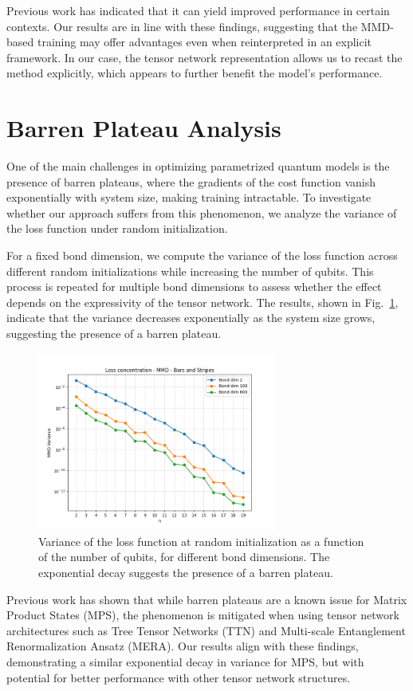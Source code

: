 Previous work \cite{rudolph_trainability_2024} has indicated that it can yield improved performance in certain contexts. Our results are in line with these findings, suggesting that the MMD-based training may offer advantages even when reinterpreted in an explicit framework. In our case, the tensor network representation allows us to recast the method explicitly, which appears to further benefit the model's performance.

\section{Barren Plateau Analysis}

One of the main challenges in optimizing parametrized quantum models is the presence of barren plateaus, where the gradients of the cost function vanish exponentially with system size, making training intractable. To investigate whether our approach suffers from this phenomenon, we analyze the variance of the loss function under random initialization.

For a fixed bond dimension, we compute the variance of the loss function across different random initializations while increasing the number of qubits. This process is repeated for multiple bond dimensions to assess whether the effect depends on the expressivity of the tensor network. The results, shown in Fig.~\ref{fig:barren_plateau}, indicate that the variance decreases exponentially as the system size grows, suggesting the presence of a barren plateau.
\begin{figure}[h]
    \centering
    \includegraphics[width=0.7\textwidth]{images/loss_concentration.png}
    \caption{Variance of the loss function at random initialization as a function of the number of qubits, for different bond dimensions. The exponential decay suggests the presence of a barren plateau.}
    \label{fig:barren_plateau}
\end{figure}
Previous work \cite{martin_barren_2023} has shown that while barren plateaus are a known issue for Matrix Product States (MPS), the phenomenon is mitigated when using tensor network architectures such as Tree Tensor Networks (TTN) and Multi-scale Entanglement Renormalization Ansatz (MERA). Our results align with these findings, demonstrating a similar exponential decay in variance for MPS, but with potential for better performance with other tensor network structures.